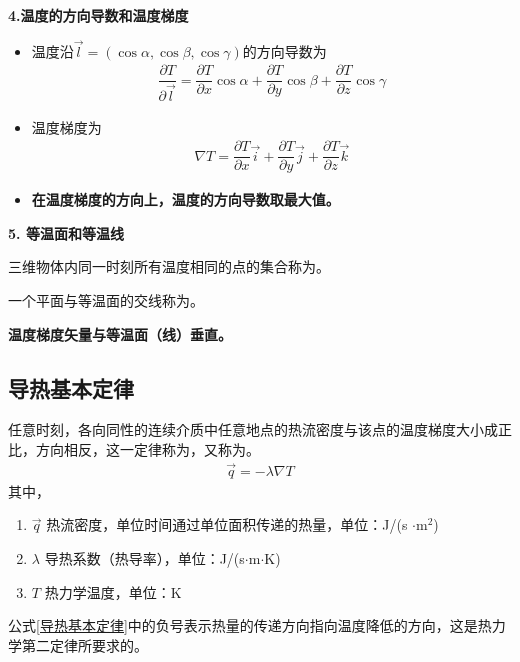 \noindent \textbf{4.温度的方向导数和温度梯度}
\begin{itemize}
	\item 温度沿$ \vec{l} = (\cos \alpha, \cos \beta, \cos \gamma)$的方向导数为
	\begin{align}
		\dfrac{\partial T}{\partial \vec{l}} = \dfrac{\partial T}{\partial x} \cos \alpha + \dfrac{\partial T}{\partial y}\cos \beta + \dfrac{\partial T}{\partial z} \cos \gamma 
	\end{align}

	\item 温度梯度为
	\begin{align}
		\nabla T = \dfrac{\partial T}{\partial x} \vec{i} + \dfrac{\partial T}{\partial y} \vec{j} + \dfrac{\partial T}{\partial z} \vec{k}
	\end{align}
	
	\item \textbf{在温度梯度的方向上，温度的方向导数取最大值。}
\end{itemize}

\noindent \textbf{5. 等温面和等温线}

	三维物体内同一时刻所有温度相同的点的集合称为。
	
	一个平面与等温面的交线称为。
	
	\textbf{温度梯度矢量与等温面（线）垂直。}
	\vspace*{1em}

\subsection{导热基本定律}

\vspace*{-1.5em}\theorem[导热基本定律]

任意时刻，各向同性的连续介质中任意地点的热流密度与该点的温度梯度大小成正比，方向相反，这一定律称为，又称为。
\begin{align}
	\vec{q} = - \lambda \nabla T
	\label{导热基本定律}
\end{align}
其中，
\begin{enumerate}[\hspace*{1.5em}]
	\item $\vec{q}$ \quad 热流密度，单位时间通过单位面积传递的热量，单位：J/(s $\cdot \text{m}^2$)\vspace*{-0.5em}
	\item $\lambda$ \quad 导热系数（热导率），单位：J/(s$\cdot$m$\cdot$K)\vspace*{-0.5em}
	\item $T$ \quad 热力学温度，单位：K\vspace*{-0.5em}
\end{enumerate}
公式\eqref{导热基本定律}中的负号表示热量的传递方向指向温度降低的方向，这是热力学第二定律所要求的。
\vspace*{1em}

